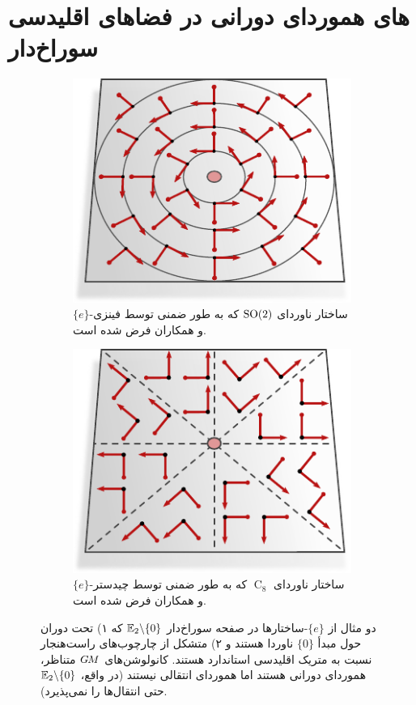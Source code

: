 

\section{های هموردای دورانی در فضاهای اقلیدسی سوراخ‌دار}
\label{sec:instantiations_euclidean_polar}

\begin{figure}
	\centering
	\begin{subfigure}[b]{0.47\textwidth}
		\centering
		\includegraphics[width=.7\textwidth]{figures/G_structure_R2_no_origin_SO2.pdf}
		\captionsetup{format=hang, width=.82\textwidth}
		\caption{\small
			$\{e\}$-ساختار ناوردای $\operatorname{SO}(2)$ 
			که به طور ضمنی توسط فینزی و همکاران \cite{finzi2020generalizing} فرض شده است.
		}
		\label{fig:G_structure_R2_no_origin_SO2}
	\end{subfigure}
	\hfill
	\begin{subfigure}[b]{0.47\textwidth}
		\centering
		\includegraphics[width=.7\textwidth]{figures/G_structure_R2_no_origin_C8.pdf}
		\captionsetup{format=hang, width=.78\textwidth}
		\caption{\small
			$\{e\}$-ساختار ناوردای $\operatorname{C}_8$ 
			 که به  طور ضمنی توسط چیدستر و همکاران \cite{chidester2019rotation}  فرض شده است.
		}
		\label{fig:G_structure_R2_no_origin_C8}
	\end{subfigure}
	\caption{\small
		دو مثال از $\{e\}$-ساختارها در صفحه سوراخ‌دار $\mathbb{E}_2 \backslash \{0\}$ که
		۱) تحت دوران حول مبدأ $\{0\}$ ناوردا هستند و
		۲) متشکل از چارچوب‌های راست‌هنجار نسبت به متریک اقلیدسی استاندارد هستند.
		کانولوشن‌های $G\mkern-1.4muM$ متناظر، هموردای دورانی هستند اما هموردای انتقالی نیستند (در واقع، $\mathbb{E}_2 \backslash \{0\}$ حتی انتقال‌ها را نمی‌پذیرد).
	}
	\label{fig:G_structures_R2_no_origin}
\end{figure}


